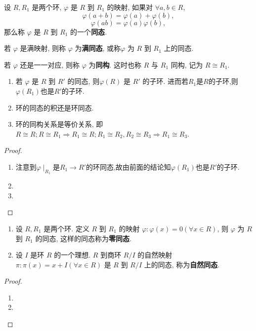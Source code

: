 \documentclass[../../main.tex]{subfiles}%
\begin{document}
\begin{definition}
设 \( R, R_1 \) 是两个环, \( \varphi \) 是 \( R \) 到 \( R_1 \) 的映射, 如果对 \( \forall a,b \in R \),
\[
\varphi(a + b) = \varphi(a) + \varphi(b),
\]
\[
\varphi(ab) = \varphi(a)\varphi(b),
\]
那么称 \( \varphi \) 是 \( R \) 到 \( R_1 \) 的一个\textbf{同态}.

若 \( \varphi \) 是满映射, 则称 \( \varphi \) 为\textbf{满同态}, 或称\( \varphi \) 为 \( R \) 到 \( R_1 \) 上的同态.

若 \( \varphi \) 还是一一对应, 则称 \( \varphi \) 为\textbf{同构}. 这时也称 \( R \) 与 \( R_1 \) 同构, 记为 \( R \cong R_1 \).
\end{definition}

\begin{proposition}\label{proposition:环同态的基本性质}
\begin{enumerate}[(1)]
\item\label{proposition:环同态的基本性质-1} 若 \( \varphi \) 是 \( R \) 到 \( R' \) 的同态, 则\( \varphi(R) \) 是 \( R' \) 的子环. 进而若$R_1$是$R$的子环,则$\varphi(R_1)$也是$R'$的子环.

\item\label{proposition:环同态的基本性质-2} 环的同态的积还是环同态. 

\item 环的同构关系是等价关系, 即 \( R \cong R; R \cong R_1 \Rightarrow R_1 \cong R; R_1 \cong R_2, R_2 \cong R_3 \Rightarrow R_1 \cong R_3 \).
\end{enumerate}
\end{proposition}
\begin{proof}
\begin{enumerate}[(1)]
\item 注意到$\varphi\mid_{R_1}$是$R_1\to R'$的环同态,故由前面的结论知$\varphi(R_1)$也是$R'$的子环.

\item 

\item 
\end{enumerate}
\end{proof}

\begin{theorem}\label{theorem:抽象代数--1.5.7}
\begin{enumerate}
\item 设 \( R, R_1 \) 是两个环. 定义 \( R \) 到 \( R_1 \) 的映射 \( \varphi: \varphi(x) = 0 (\forall x \in R) \), 则 \( \varphi \) 为 \( R \) 到 \( R_1 \) 的同态, 这样的同态称为\textbf{零同态}.

\item 设 \( I \) 是环 \( R \) 的一个理想. \( R \) 到商环 \( R/I \) 的自然映射 \( \pi: \pi(x) = x + I (\forall x \in R) \) 是 \( R \) 到 \( R/I \) 上的同态, 称为\textbf{自然同态}.
\end{enumerate}
\end{theorem}
\begin{proof}
\begin{enumerate}
\item 

\item 
\end{enumerate}
\end{proof}
\end{document}
